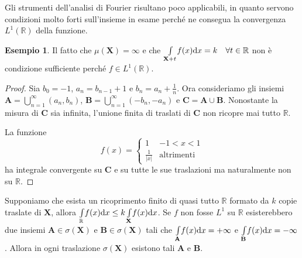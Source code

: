 \documentclass[12pt]{article}
\newcommand\rea{\mathbb R}
\newcommand\ins[1]{\mathbf #1}
\newcommand\intesx[2]{\int\limits_{#1}\!#2(x)\text dx}
\theoremstyle{definition}
\newtheorem{esem}{Esempio}
\begin{document}
Gli strumenti dell'analisi di Fourier risultano poco applicabili,
in quanto servono condizioni molto forti sull'insieme in esame
perché ne consegua la convergenza $L^1(\rea)$ della funzione.
\begin{esem}Il fatto che $\mu(\ins X)=\infty$ e che
$\intesx{\ins X+t}f=k\quad\forall t\in\rea$
non è condizione sufficiente perché $f\in L^1(\rea)$.
\end{esem}
\begin{proof}Sia $b_0=-1$, $a_n=b_{n-1}+1$ e $b_n=a_n+\frac1n$.
Ora consideriamo gli insiemi $\ins A=\bigcup_{n=1}^\infty(a_n,b_n)$,
$\ins B=\bigcup_{n=1}^\infty(-b_n,-a_n)$ e $\ins C=\ins A\cup\ins B$.
Nonostante la misura di $\ins C$ sia infinita,
l'unione finita di traslati di $\ins C$ non ricopre mai tutto $\rea$.

La funzione
\begin{equation*}
f(x)=\left\{\begin{matrix}1&-1<x<1\\\frac1{|x|}&\text {altrimenti}
\end{matrix}\right.
\end{equation*}
ha integrale convergente su $\ins C$ e su tutte le sue traslazioni
ma naturalmente non su $\rea$.
\end{proof}
Supponiamo che esista un ricoprimento finito di quasi tutto $\rea$
formato da $k$ copie traslate di $\ins X$,
allora $\intesx\rea f\leq k\intesx{\ins X}f$.
Se $f$ non fosse $L^1$ su $\rea$ esisterebbero due insiemi
$\ins A\in\sigma(\ins X)$ e $\ins B\in\sigma(\ins X)$ tali che
$\intesx{\ins A}f=+\infty$ e $\intesx{\ins B}f=-\infty$.
Allora in ogni traslazione $\sigma(\ins X)$ esistono tali $\ins A$ e $\ins B$.
\end{document}
